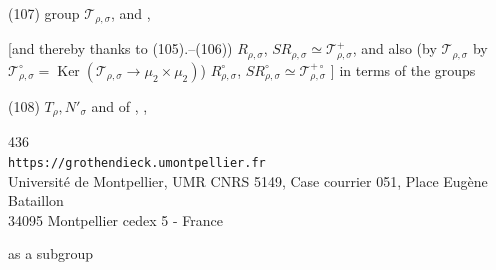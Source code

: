 \noindent(107) group $\mathcal{T}_{\rho,\sigma}$, and 
,

[and thereby thanks to (105).--(106)) $R_{\rho,\sigma}$,
$SR_{\rho,\sigma}\simeq\mathcal{T}_{\rho,\sigma}^{+}$, and also
(by 
$\mathcal{T}_{\rho,\sigma}$ by
$\mathcal{T}_{\rho,\sigma}^{\circ}=\operatorname{Ker}
(\mathcal{T}_{\rho,\sigma}\longrightarrow\mu_2\times\mu_2)$)
$R_{\rho,\sigma}^{\circ}$,
$SR_{\rho,\sigma}^{\circ}\simeq\mathcal{T}_{\rho,\sigma}^{+\circ}$
\unsure{$\Rightarrow$}]
in terms of the groups

\noindent(108) $T_\rho,N'_\sigma$ and of
,
,


\begin{center}
{\small
436\\
\texttt{https://grothendieck.umontpellier.fr}\\
Université de Montpellier, UMR CNRS 5149, Case courrier 051, Place Eugène Bataillon\\
34095 Montpellier cedex 5 - France
}
\end{center}


as a subgroup

